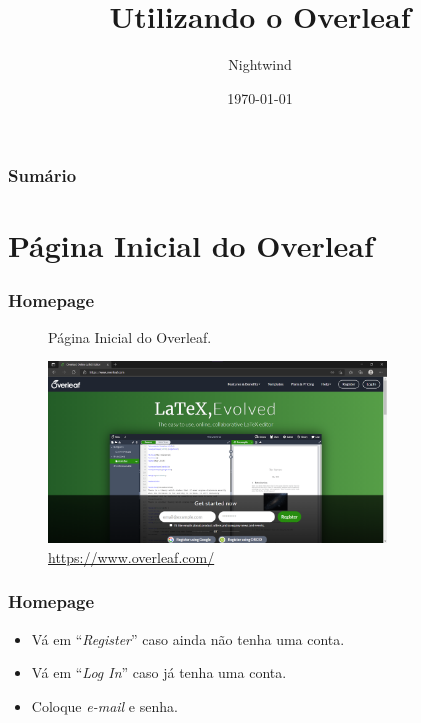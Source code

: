 \documentclass{beamer}
\title{Utilizando o Overleaf}
\author{Nightwind}
\institute[CTISM]{Colégio Técnico Industrial de Santa Maria}
\date{\today}
\begin{document}
    \frame{\titlepage}

    \begin{frame}
        \frametitle{Sumário}
        \tableofcontents
    \end{frame}

    \section[Página Inicial]{Página Inicial do Overleaf}
    \begin{frame}
        \frametitle{Homepage}
    \begin{figure}
        \centering
        \caption[HomePage]{Página Inicial do Overleaf.}
        \label{fig:homepageOverleaf}
        \includegraphics[width=0.8\textwidth]{../images/homepageOverleaf.png}
        \caption*{\footnotesize \url{https://www.overleaf.com/}}
    \end{figure}    
    \end{frame}

    \begin{frame}
        \frametitle{Homepage}
    \begin{itemize}
        \item Vá em ``\textit{Register}'' caso ainda não tenha uma conta.
        \item Vá em ``\textit{Log In}'' caso já tenha uma conta. 
        \item Coloque \textit{e-mail} e senha.
    \end{itemize}
    \end{frame}
        
\end{document}
